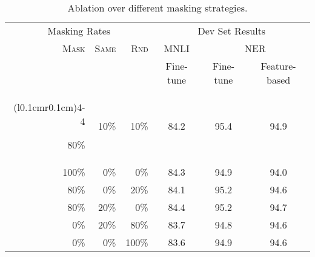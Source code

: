 \begin{table}[ht]
\begin{center}
{\small
\begin{tabular}{@{}rrrccc@{}}
  \toprule
  \multicolumn{3}{c}{Masking Rates} & \multicolumn{3}{c}{Dev Set Results} \\
  \cmidrule(r{0.2cm}){1-3}
  \cmidrule(l{0.2cm}){4-6}
  \textsc{Mask} &	\textsc{Same}&	\textsc{Rnd}	& {MNLI} &	\multicolumn{2}{c}{NER}\\
   &  & & {\footnotesize Fine-tune} &   {\footnotesize Fine-tune}	& {\footnotesize Feature-based}\\
    \cmidrule(r{0.2cm}){1-3}
  \cmidrule(l{0.1cm}r{0.1cm}){4-4}
  \cmidrule(l{0.2cm}){5-6}
  
  80\%	&10\%	&10\%	&84.2	&95.4	&94.9\\
100\%	&0\%	&0\%	&84.3	&94.9	&94.0\\
80\%	&0\%	&20\%	&84.1	&95.2	&94.6\\
80\%	&20\%	&0\%	&84.4	&95.2	&94.7\\
0\%	&20\%	&80\%	&83.7	&94.8	&94.6 \\
0\%	&0\%	&100\%	&83.6	&94.9	&94.6\\
\bottomrule
\end{tabular}
} %
\end{center}
\caption{\label{tab:mask_ablation} Ablation over different masking strategies.}
\end{table}

